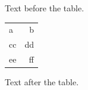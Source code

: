 \documentclass[12pt]{article}
\begin{document}
Text before the table.

\begin{tabular}{lr}a & b\\cc & dd\\ee & ff\end{tabular}

Text after the table.
\end{document}
